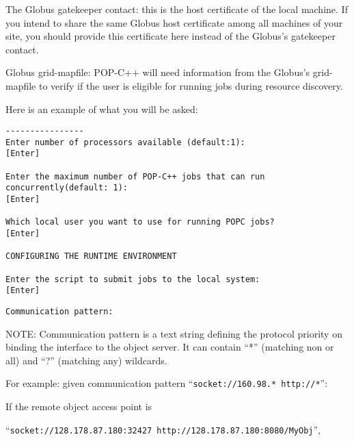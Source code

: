 \begin{enumerate}
    \begin{petitem}

	\item The Globus gatekeeper contact: this is the host
	certificate of the local machine. If you intend to share the
	same Globus host certificate among all machines of your site,
	you should  provide this certificate here instead of the
	Globus's gatekeeper contact.

	\item Globus grid-mapfile: POP-C++ will need information from
	the Globus's grid-mapfile to verify if the user is eligible for running
	jobs during resource discovery.

    \end{petitem}

Here is an example of what you will be asked:
\begin{small}
\begin{verbatim}
----------------
Enter number of processors available (default:1):
[Enter]

Enter the maximum number of POP-C++ jobs that can run
concurrently(default: 1):
[Enter]

Which local user you want to use for running POPC jobs?
[Enter]

CONFIGURING THE RUNTIME ENVIRONMENT

Enter the script to submit jobs to the local system:
[Enter]

\end{verbatim}



\begin{verbatim}
Communication pattern:
\end{verbatim}

NOTE: Communication pattern is a text string defining the protocol priority on binding the interface to the object server. It can contain ``*'' (matching non or all) and ``?'' (matching any) wildcards. 

For example: given communication pattern ``\texttt{socket://160.98.* http://*}'':
\begin{petitem}
\item If the remote object access point is

 ``\texttt{socket://128.178.87.180:32427 http://128.178.87.180:8080/MyObj}'', 


\end{petitem}
\end{small}
\end{enumerate}
